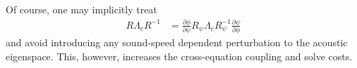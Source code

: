 \documentclass[letterpaper,11pt,nointlimits,reqno]{amsart}
\begin{document}
Of course, one may implicitly treat
\begin{align}
  R \Lambda_c R^{-1}
 &=
  \frac{\partial \phi}{\partial \psi}
  R_\psi \Lambda_c R_\psi^{-1}
  \frac{\partial \psi}{\partial \phi}
\end{align}
and avoid introducing any sound-speed dependent perturbation to the acoustic
eigenspace.  This, however, increases the cross-equation coupling and
solve costs.

\end{document}
